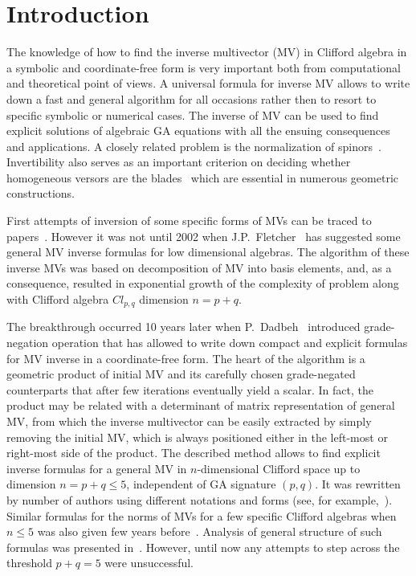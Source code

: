\documentclass{birkjour}
\begin{document}
\section{Introduction\label{sec:1}}

The knowledge of how to find the inverse multivector (MV) in
Clifford algebra in a symbolic and coordinate-free form is very
important both from computational and theoretical point of views.
A universal formula for inverse MV allows to write down a fast and
general algorithm for all occasions rather then to resort to
specific symbolic or numerical cases. The inverse of MV can be
used to find explicit solutions of algebraic GA equations with all
the ensuing consequences and applications. A closely related
problem is the normalization of spinors~\cite{Vaz2016,Lundholm09}.
Invertibility also serves as an important criterion on deciding
whether homogeneous versors are the blades~\cite{Bouma2001} which
are essential in numerous geometric constructions.

First attempts of inversion of some specific forms of MVs can be
traced to papers~\cite{Semenov1991, Semenov1993A,Semenov1993B}.
However it was not until 2002 when
J.P.~Fletcher~\cite{Fletcher2002} has suggested some general MV
inverse formulas for low dimensional algebras. The algorithm of
these inverse MVs was based on decomposition of MV into basis
elements, and, as a consequence, resulted in exponential growth of
the complexity of problem along with  Clifford algebra $Cl_{p,q}$
dimension $n=p+q$.

The breakthrough occurred 10 years later when
P.~Dadbeh~\cite{Dadbeh2011} introduced grade-negation operation
that has  allowed  to write down compact and explicit formulas for
MV inverse in a coordinate-free form. The heart of the algorithm
is a geometric product of initial MV and its carefully chosen
grade-negated counterparts that after few iterations eventually
yield a scalar. In fact, the product may be related with a
determinant of matrix representation of general MV, from which the
inverse multivector can be easily extracted  by simply removing
the initial MV, which is always positioned either in the left-most
or right-most side of the product. The described method allows to
find explicit inverse formulas for a general MV in $n$-dimensional
Clifford space  up to dimension $n=p+q\le 5$, independent of GA
signature $(p,q)$. It was rewritten by number of authors using
different notations and forms (see, for
example,~\cite{Shirokov2012,Hitzer2016}). Similar formulas for the
norms of MVs for a few specific Clifford algebras when  $n\le 5$
was also given  few years before~\cite{Lundholm09}. Analysis of
general structure of such formulas was presented
in~\cite{Suzuki2016}. However, until now any attempts to
step across the threshold  $p+q=5$ were unsuccessful.
\end{document}
